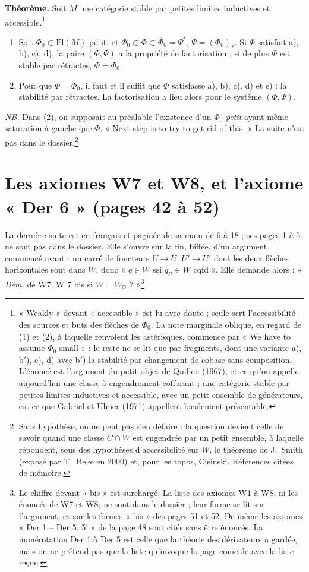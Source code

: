 \documentclass[11pt,a4paper]{article}
\begin{document}
\textbf{Théorème.} Soit $M$ une catégorie stable par petites limites
inductives et accessible.\footnote{« Weakly » devant « accessible » est lu avec doute ; seule sert
l'accessibilité des sources et buts des flèches de $\Phi_0$. La note
marginale oblique, en regard de (1) et (2), à laquelle renvoient les astérisques,
commence par « We have to assume $\Phi_0$ small » ; le reste ne se lit que par
fragments, dont une variante a), b$'$), c), d) avec b$'$) la stabilité par
changement de cobase sans composition. L'énoncé est l'argument du petit objet
de Quillen (1967), et ce qu'on appelle aujourd'hui une classe à engendrement
cofibrant ; une catégorie stable par petites limites inductives et accessible,
avec un petit ensemble de générateurs, est ce que Gabriel et Ulmer (1971)
appellent localement présentable.}
\begin{enumerate}
\item[(1)] Soit $\Phi_0 \subset \mathrm{Fl}(M)$ petit, et
$\Phi_0 \subset \Phi \subset \overline{\Phi}_0 = \Psi^*$, $\Psi = (\Phi_0)_*$.
Si $\Phi$ satisfait a), b), c), d), la paire $(\Phi, \Psi)$ a la propriété de
factorisation ; si de plus $\Phi$ est stable par rétractes,
$\Phi = \overline{\Phi}_0$.
\item[(2)] Pour que $\Phi = \overline{\Phi}_0$, il faut et il suffit que $\Phi$
satisfasse a), b), c), d) et e) : la stabilité par rétractes. La
factorisation a lieu alors pour le système $(\Phi, \Psi)$.
\end{enumerate}

\emph{NB.} Dans (2), on supposait au préalable l'existence d'un $\Phi_0$
\emph{petit} ayant même saturation à gauche que $\Phi$. « Next step is to try
to get rid of this. » La suite n'est pas dans le dossier.\footnote{Sans
hypothèse, on ne peut pas s'en défaire : la question devient celle de savoir
quand une classe $C \cap W$ est engendrée par un petit ensemble, à laquelle
répondent, sous des hypothèses d'accessibilité sur $W$, le théorème de
J.~Smith (exposé par T.~Beke en 2000) et, pour les topos, Cisinski. Références
citées de mémoire.}

\section*{Les axiomes W7 et W8, et l'axiome « Der 6 » (pages 42 à 52)}

La dernière suite est en français et paginée de sa main de 6 à 18 ; ses pages 1
à 5 ne sont pas dans le dossier. Elle s'ouvre sur la fin, biffée, d'un
argument commencé avant : un carré de foncteurs $U \to \overline{U}$,
$U' \to \overline{U}'$ dont les deux flèches horizontales sont dans $W$, donc
« $q \in W$ ssi $q_U \in W$ cqfd ». Elle demande alors : « \emph{Dém.} de W7,
W 7 bis si $W = W_{\mathbb D}$ ? »\footnote{Le chiffre devant « bis » est
surchargé. La liste des axiomes W1 à W8, ni les énoncés de W7 et W8, ne sont
dans le dossier ; leur forme se lit sur l'argument, et sur les formes « bis »
des pages 51 et 52. De même les axiomes « Der 1 -- Der 5, 5' » de la page 48
sont cités sans être énoncés. La numérotation Der 1 à Der 5 est celle que la
théorie des dérivateurs a gardée, mais on ne prétend pas que la liste
qu'invoque la page coïncide avec la liste reçue.}
\end{document}
